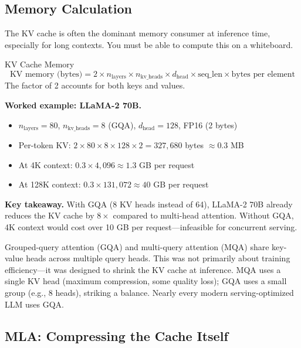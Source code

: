 \subsection{Memory Calculation}

The KV cache is often the dominant memory consumer at inference time, especially for long contexts. You must be able to compute this on a whiteboard.

\begin{mathresult}{KV Cache Memory}
\[
\text{KV memory (bytes)} = 2 \times n_{\text{layers}} \times n_{\text{kv\_heads}} \times d_{\text{head}} \times \text{seq\_len} \times \text{bytes per element}
\]
The factor of 2 accounts for both keys and values.
\end{mathresult}

\textbf{Worked example: LLaMA-2 70B.}
\begin{itemize}
    \item $n_{\text{layers}} = 80$, $n_{\text{kv\_heads}} = 8$ (GQA), $d_{\text{head}} = 128$, FP16 (2 bytes)
    \item Per-token KV: $2 \times 80 \times 8 \times 128 \times 2 = 327{,}680$ bytes $\approx 0.3$ MB
    \item At 4K context: $0.3 \times 4{,}096 \approx 1.3$ GB per request
    \item At 128K context: $0.3 \times 131{,}072 \approx 40$ GB per request
\end{itemize}

\textbf{Key takeaway.} With GQA (8 KV heads instead of 64), LLaMA-2 70B already reduces the KV cache by $8\times$ compared to multi-head attention. Without GQA, 4K context would cost over 10 GB per request---infeasible for concurrent serving.

\begin{keyinsight}
Grouped-query attention (GQA) and multi-query attention (MQA) share key-value heads across multiple query heads. This was not primarily about training efficiency---it was designed to shrink the KV cache at inference. MQA uses a single KV head (maximum compression, some quality loss); GQA uses a small group (e.g., 8 heads), striking a balance. Nearly every modern serving-optimized LLM uses GQA.
\end{keyinsight}

\subsection{MLA: Compressing the Cache Itself}
\label{sec:mla_serving}

